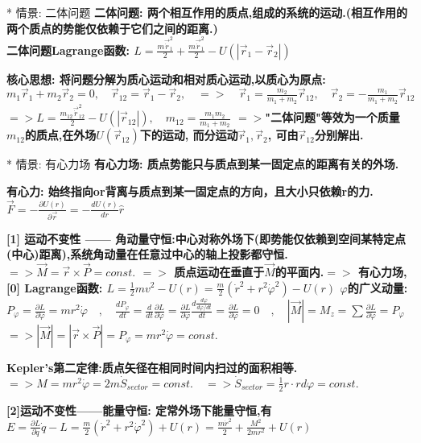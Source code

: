     * 情景: 二体问题
        \bf{二体问题}: 两个相互作用的质点,组成的系统的运动.(相互作用的两个质点的势能仅依赖于它们之间的距离.)\\
        二体问题Lagrange函数:
            $L = \frac{m \vec \dot r_1^2}{2} + \frac{m \vec \dot r_1^2}{2} - U(|\vec r_1 - \vec r_2|)$
        
        \bf{核心思想}: 将问题分解为\bf{质心运动}和\bf{相对质心运动},以质心为原点:
            $m_1\vec r_1 + m_2 \vec r_2 =0,\quad \vec r_{12} = \vec r_1 - \vec r_2, \quad => \quad \vec r_1 = \frac{m_2}{m_1 + m_2}\vec r_{12}, \quad \vec r_2 = - \frac{m_1}{m_1 + m_2}\vec r_{12} $
            $=> L = \frac{m_{12} \vec \dot r_{12}^2}{2} - U(|\vec r_{12}|), \quad m_{12} = \frac{m_1 m_2}{m_1 + m_2}$
            $=>$"二体问题"等效为一个质量$m_{12}$的质点,在外场$U(\vec r_{12})$下的运动, 而分运动$\vec r_1, \vec r_2$, 可由$\vec r_{12}$分别解出.
        
        
    * 情景: 有心力场
        \bf{有心力场}: 质点势能只与质点到某一固定点的距离有关的外场.
        
        \bf{有心力}: 始终指向or背离与质点到某一固定点的方向，且大小只依赖r的力.
            $\vec F = -\frac{∂ U(r)}{∂ \vec r} = -\frac{d U(r)}{d r} \hat r$
    
        \bf{[1] 运动不变性 —— 角动量守恒}:中心对称外场下(即势能仅依赖到空间某特定点(中心)距离),系统角动量在任意过中心的轴上投影都守恒.
            $=> \vec M = \vec r \times \vec P = const.$
            $=>$ 质点运动在垂直于$\vec M$的平面内.\quad $=>$ 有心力场,\bf{[0] Lagrange函数}:
            $L = \frac{1}{2}m v^2 - U(r) = \frac{m}{2} (\dot r^2 + r^2 \dot \varphi ^2) - U(r)$
            $\varphi$的广义动量:
            $P_\varphi = \frac{∂ L}{∂ \dot \varphi} = m r^2 \dot \varphi \quad , \quad \frac{d P_\varphi}{d t} = \frac{d}{d t}\frac{∂ L}{∂ \dot \varphi} = \frac{∂ L}{∂ \varphi} \frac{d \frac{d \varphi}{d \varphi / d t}}{d t} = \frac{∂ L}{∂ \varphi} = 0 \quad , \quad |\vec M| = M_z = \sum \frac{∂ L}{∂  \dot \varphi} = P_\varphi$
            $=> |\vec M| =| \vec r \times \vec P |= P_\varphi = m r^2 \dot \varphi = const.$
    
        \bf{Kepler's第二定律}:质点矢径在相同时间内扫过的面积相等.
            $=> M = m r^2 \dot \varphi = 2 m \dot S_{sector} = const.\quad => \dot S_{sector} = \frac{1}{2} r \cdot r d\varphi = const.$
    
        \bf{[2]运动不变性——能量守恒}: 定常外场下能量守恒,有
            $E = \frac{∂ L}{∂ \dot q}\dot q - L = \frac{m}{2} (\dot r^2 + r^2 \dot \varphi ^2) + U(r) = \frac{m \dot r^2}{2} + \frac{M^2}{2mr^2} + U(r)$
    
